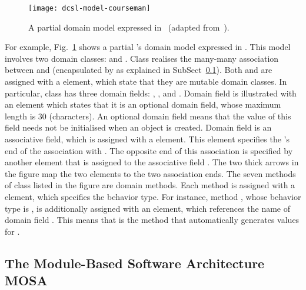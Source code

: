 \begin{figure}[ht]
	\centering
	\texttt{[image: dcsl-model-courseman]}
	\caption{A partial \courseman domain model expressed in \dcsl~(adapted from~\cite{le_domain_2018}).}
	\label{fig:dcsl_courseman}
\end{figure}

For example, Fig.~\ref{fig:dcsl_courseman} shows a partial \courseman's domain model expressed in \dcsl. This model involves two domain classes:  and . Class  realises the many-many association between  and  (encapsulated by  as explained in SubSect~\ref{sect:bg-arch}). Both  and  are assigned with a  element, which state that they are mutable domain classes. In particular, class  has three domain fields: , , and . Domain field  is illustrated with an  element which states that it is an optional domain field, whose maximum length is 30 (characters). An optional domain field means that the value of this field needs not be initialised when an object is created. Domain field  is an associative field, which is assigned with a  element. This element specifies the 's end of the association with . The opposite end of this association is specified by another  element that is assigned to the associative field . The two thick arrows in the figure map the two  elements to the two association ends. 
%
The seven methods of class  listed in the figure are domain methods. Each method is assigned with a  element, which specifies the behavior type. For instance, method , whose behavior type is , is additionally assigned with an  element, which references the name of domain field . This means that  is the method that automatically generates values for .

\subsection{The Module-Based Software Architecture MOSA}
\label{sect:bg-arch} %

